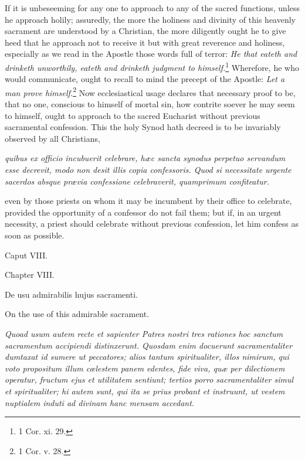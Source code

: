 If it is unbeseeming for any one to approach to any of the sacred functions, unless he approach holily; assuredly, the more the holiness and divinity of this heavenly sacrament are understood by a Christian, the more diligently ought he to give heed that he approach not to receive it but with great reverence and holiness, especially as we read in the Apostle those words full of terror: \emph{He that eateth and drinketh unworthily, eateth and drinketh judgment to himself.}\footnote{\par   1 Cor. xi. 29.} Wherefore, he who would communicate, ought to recall to mind the precept of the Apostle: \emph{Let a man prove himself.}\footnote{\par   1 Cor. v. 28.} Now ecclesiastical usage declares that necessary proof to be, that no one, conscious to himself of mortal sin, how contrite soever he may seem to himself, ought to approach to the sacred Eucharist without previous sacramental confession. This the holy Synod hath decreed is to be invariably observed by all Christians,

\emph{quibus ex officio incubuerit celebrare, hæc sancta synodus perpetuo servandum esse decrevit, modo non desit illis copia confessoris. Quod si necessitate urgente sacerdos absque prævia confessione celebraverit, quamprimum confiteatur.}

even by those priests on whom it may be incumbent by their office to celebrate, provided the opportunity of a confessor do not fail them; but if, in an urgent necessity, a priest should celebrate without previous confession, let him confess as soon as possible.

Caput VIII.

Chapter VIII.

De usu admirabilis hujus sacramenti.

On the use of this admirable sacrament.

\emph{Quoad usum autem recte et sapienter Patres nostri tres rationes hoc sanctum sacramentum accipiendi distinxerunt. Quosdam enim docuerunt sacramentaliter dumtaxat id sumere ut peccatores; alios tantum spiritualiter, illos nimirum, qui voto propositum illum cœlestem panem edentes, fide viva, quæ per dilectionem operatur, fructum ejus et utilitatem sentiunt; tertios porro sacramentaliter simul et spiritualiter; hi autem sunt, qui ita se prius probant et instruunt, ut vestem nuptialem induti ad divinam hanc mensam accedant.}

